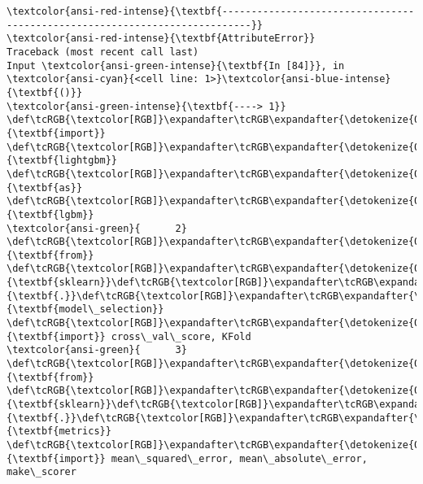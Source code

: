 \documentclass[11pt]{article}
\begin{document}
    \begin{Verbatim}[commandchars=\\\{\}, frame=single, framerule=2mm, rulecolor=\color{outerrorbackground}]
\textcolor{ansi-red-intense}{\textbf{---------------------------------------------------------------------------}}
\textcolor{ansi-red-intense}{\textbf{AttributeError}}                            Traceback (most recent call last)
Input \textcolor{ansi-green-intense}{\textbf{In [84]}}, in \textcolor{ansi-cyan}{<cell line: 1>}\textcolor{ansi-blue-intense}{\textbf{()}}
\textcolor{ansi-green-intense}{\textbf{----> 1}} \def\tcRGB{\textcolor[RGB]}\expandafter\tcRGB\expandafter{\detokenize{0,135,0}}{\textbf{import}} \def\tcRGB{\textcolor[RGB]}\expandafter\tcRGB\expandafter{\detokenize{0,0,255}}{\textbf{lightgbm}} \def\tcRGB{\textcolor[RGB]}\expandafter\tcRGB\expandafter{\detokenize{0,135,0}}{\textbf{as}} \def\tcRGB{\textcolor[RGB]}\expandafter\tcRGB\expandafter{\detokenize{0,0,255}}{\textbf{lgbm}}
\textcolor{ansi-green}{      2} \def\tcRGB{\textcolor[RGB]}\expandafter\tcRGB\expandafter{\detokenize{0,135,0}}{\textbf{from}} \def\tcRGB{\textcolor[RGB]}\expandafter\tcRGB\expandafter{\detokenize{0,0,255}}{\textbf{sklearn}}\def\tcRGB{\textcolor[RGB]}\expandafter\tcRGB\expandafter{\detokenize{0,0,255}}{\textbf{.}}\def\tcRGB{\textcolor[RGB]}\expandafter\tcRGB\expandafter{\detokenize{0,0,255}}{\textbf{model\_selection}} \def\tcRGB{\textcolor[RGB]}\expandafter\tcRGB\expandafter{\detokenize{0,135,0}}{\textbf{import}} cross\_val\_score, KFold
\textcolor{ansi-green}{      3} \def\tcRGB{\textcolor[RGB]}\expandafter\tcRGB\expandafter{\detokenize{0,135,0}}{\textbf{from}} \def\tcRGB{\textcolor[RGB]}\expandafter\tcRGB\expandafter{\detokenize{0,0,255}}{\textbf{sklearn}}\def\tcRGB{\textcolor[RGB]}\expandafter\tcRGB\expandafter{\detokenize{0,0,255}}{\textbf{.}}\def\tcRGB{\textcolor[RGB]}\expandafter\tcRGB\expandafter{\detokenize{0,0,255}}{\textbf{metrics}} \def\tcRGB{\textcolor[RGB]}\expandafter\tcRGB\expandafter{\detokenize{0,135,0}}{\textbf{import}} mean\_squared\_error, mean\_absolute\_error, make\_scorer


\end{Verbatim}
\end{document}
